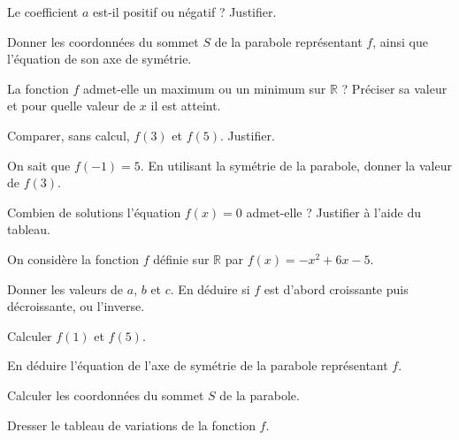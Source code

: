 \documentclass[11pt,a4paper]{article}  %
\begin{document}
	\begin{center}
	\end{center}

	\begin{enumMet}
		\item Le coefficient $a$ est-il positif ou négatif ? Justifier.
		\item Donner les coordonnées du sommet $S$ de la parabole représentant $f$, ainsi que l'équation de son axe de symétrie.
		\item La fonction $f$ admet-elle un maximum ou un minimum sur $\mathbb{R}$ ? Préciser sa valeur et pour quelle valeur de $x$ il est atteint.
		\item Comparer, sans calcul, $f(3)$ et $f(5)$. Justifier.
		\item {} On sait que $f(-1)=5$. En utilisant la symétrie de la parabole, donner la valeur de $f(3)$.
		\item Combien de solutions l'équation $f(x)=0$ admet-elle ? Justifier à l'aide du tableau.
	\end{enumMet}

	\newpage

	\exerciceDS{ $-$ (4,5 points)}

	On considère la fonction $f$ définie sur $\mathbb{R}$ par $f(x)=-x^2+6x-5$.

	\begin{enumMet}
		\item Donner les valeurs de $a$, $b$ et $c$. En déduire si $f$ est d'abord croissante puis décroissante, ou l'inverse.
		\item Calculer $f(1)$ et $f(5)$.
		\item En déduire l'équation de l'axe de symétrie de la parabole représentant $f$.
		\item Calculer les coordonnées du sommet $S$ de la parabole.
		\item {} Dresser le tableau de variations de la fonction $f$.
	\end{enumMet}
\end{document}
